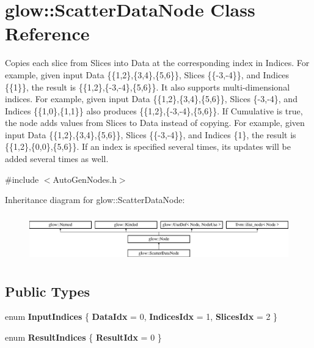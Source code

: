 \hypertarget{classglow_1_1_scatter_data_node}{}\section{glow\+:\+:Scatter\+Data\+Node Class Reference}
\label{classglow_1_1_scatter_data_node}


Copies each slice from Slices into Data at the corresponding index in Indices. For example, given input Data \{\{1,2\},\{3,4\},\{5,6\}\}, Slices \{\{-\/3,-\/4\}\}, and Indices \{\{1\}\}, the result is \{\{1,2\},\{-\/3,-\/4\},\{5,6\}\}. It also supports multi-\/dimensional indices. For example, given input Data \{\{1,2\},\{3,4\},\{5,6\}\}, Slices \{-\/3,-\/4\}, and Indices \{\{1,0\},\{1,1\}\} also produces \{\{1,2\},\{-\/3,-\/4\},\{5,6\}\}. If Cumulative is true, the node adds values from Slices to Data instead of copying. For example, given input Data \{\{1,2\},\{3,4\},\{5,6\}\}, Slices \{\{-\/3,-\/4\}\}, and Indices \{1\}, the result is \{\{1,2\},\{0,0\},\{5,6\}\}. If an index is specified several times, its updates will be added several times as well.  




{\ttfamily \#include $<$Auto\+Gen\+Nodes.\+h$>$}

Inheritance diagram for glow\+:\+:Scatter\+Data\+Node\+:\begin{figure}[H]
\begin{center}
\leavevmode
\includegraphics[height=2.028986cm]{classglow_1_1_scatter_data_node}
\end{center}
\end{figure}
\subsection*{Public Types}
\begin{DoxyCompactItemize}
\item 
\mbox{\label{classglow_1_1_scatter_data_node_aa1baf2a37a064cd1b8fe017ab70400b6}} 
enum {\bfseries Input\+Indices} \{ {\bfseries Data\+Idx} = 0, 
{\bfseries Indices\+Idx} = 1, 
{\bfseries Slices\+Idx} = 2
 \}
\item 
\mbox{\label{classglow_1_1_scatter_data_node_a8259c69eb26a363d540e5c3df211d903}} 
enum {\bfseries Result\+Indices} \{ {\bfseries Result\+Idx} = 0
 \}
\end{DoxyCompactItemize}
